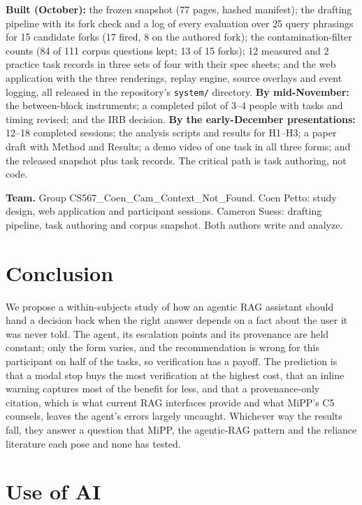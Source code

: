 \documentclass[sigconf,nonacm]{acmart}
\begin{document}
\textbf{Built (October):} the frozen snapshot (77 pages, hashed
manifest); the drafting pipeline with its fork check and a log of every
evaluation over 25 query phrasings for 15 candidate forks (17 fired, 8 on
the authored fork); the contamination-filter counts (84 of 111 corpus
questions kept; 13 of 15 forks); 12 measured and 2 practice task records
in three sets of four with their spec sheets; and the web application with
the three renderings, replay engine, source overlays and event logging,
all released in the repository's \texttt{system/} directory.
\textbf{By mid-November:} the between-block instruments; a completed
pilot of 3--4 people with tasks and timing revised; and the IRB decision.
\textbf{By the early-December presentations:} 12--18 completed sessions;
the analysis scripts and results for H1--H3; a paper draft with Method and
Results; a demo video of one task in all three forms; and the released
snapshot plus task records. The critical path is task authoring, not code.

\textbf{Team.} Group CS567\_Coen\_Cam\_Context\_Not\_Found. Coen Petto:
study design, web application and participant sessions. Cameron Suess:
drafting pipeline, task authoring and corpus snapshot. Both authors write
and analyze.

\section{Conclusion}

We propose a within-subjects study of how an agentic RAG assistant should
hand a decision back when the right answer depends on a fact about the user
it was never told. The agent, its escalation points and its provenance are
held constant; only the form varies, and the recommendation is wrong for
this participant on half of the tasks, so verification has a payoff. The
prediction is that a modal stop buys the most verification at the highest
cost, that an inline warning captures most of the benefit for less, and
that a provenance-only citation, which is what current RAG interfaces
provide and what MiPP's C5 counsels, leaves the agent's errors largely
uncaught. Whichever way the results fall, they answer a question that
MiPP, the agentic-RAG pattern and the reliance literature each pose and
none has tested.

\section*{Use of AI}
\end{document}

